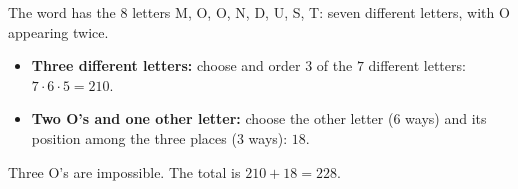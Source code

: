 The word has the $8$ letters M, O, O, N, D, U, S, T: seven different letters, with O appearing twice.
\begin{itemize}
\item \textbf{Three different letters:} choose and order $3$ of the $7$ different letters: $7\cdot6\cdot5=210$.
\item \textbf{Two O's and one other letter:} choose the other letter ($6$ ways) and its position among the three places ($3$ ways): $18$.
\end{itemize}
Three O's are impossible. The total is $210+18=\boxed{228}$.
